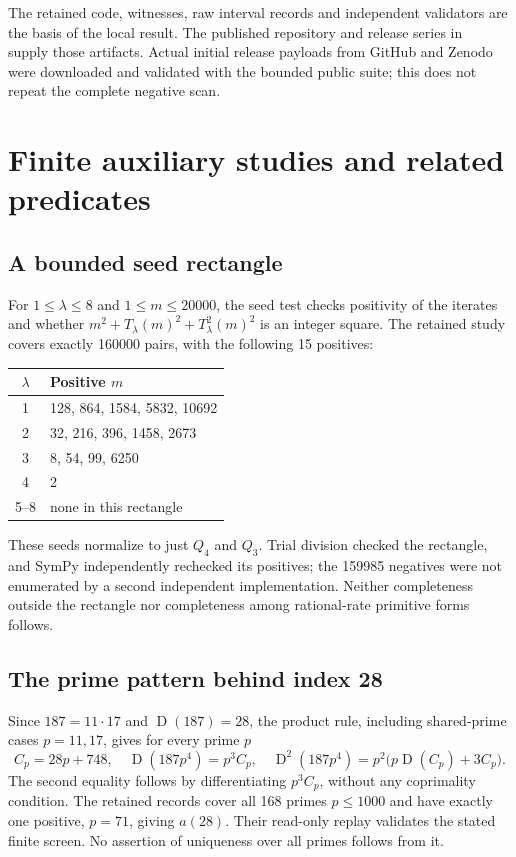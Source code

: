 \documentclass[11pt]{article}
\newcommand{\D}{\operatorname{D}}
\theoremstyle{definition}
\begin{document}
The retained code, witnesses, raw interval records and independent
validators are the basis of the local result. The published repository
and release series in~\cite{project} supply those artifacts. Actual initial
release payloads from GitHub and Zenodo were downloaded and validated with
the bounded public suite; this does not repeat the complete negative scan.

\section{Finite auxiliary studies and related predicates}\label{sec:finite}
\subsection{A bounded seed rectangle}
For $1\le\lambda\le8$ and $1\le m\le20000$, the seed test checks
positivity of the iterates and whether
$m^2+T_\lambda(m)^2+T_\lambda^2(m)^2$ is an integer square.
The retained study covers exactly 160000 pairs, with the following
15 positives:
\begin{center}\small
\begin{tabular}{cl}
\toprule
$\lambda$ & Positive $m$\\
\midrule
1 & 128, 864, 1584, 5832, 10692\\
2 & 32, 216, 396, 1458, 2673\\
3 & 8, 54, 99, 6250\\
4 & 2\\
5--8 & none in this rectangle\\
\bottomrule
\end{tabular}
\end{center}
These seeds normalize to just $Q_4$ and $Q_3$. Trial division checked
the rectangle, and SymPy independently rechecked its positives; the
159985 negatives were not enumerated by a second independent
implementation. Neither completeness outside the rectangle nor
completeness among rational-rate primitive forms follows.

\subsection{The prime pattern behind index 28}
Since $187=11\cdot17$ and $\D(187)=28$, the product rule, including
shared-prime cases $p=11,17$, gives for every prime $p$
\begin{equation}\label{eq:pattern}
 C_p=28p+748,\quad \D(187p^4)=p^3C_p,\quad
 \D^2(187p^4)=p^2\bigl(p\D(C_p)+3C_p\bigr).
\end{equation}
The second equality follows by differentiating $p^3C_p$, without any
coprimality condition. The retained records cover all 168 primes
$p\le1000$ and have exactly one positive, $p=71$, giving $a(28)$.
Their read-only replay validates the stated finite screen. No assertion
of uniqueness over all primes follows from it.
\end{document}
